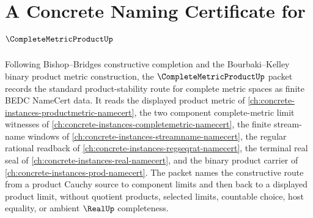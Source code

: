 \chapter{A Concrete Naming Certificate for $\CompleteMetricProductUp$}
\label{ch:concrete-instances-complete-metric-product-namecert}

Following Bishop--Bridges constructive completion and the Bourbaki--Kelley
binary product metric construction, the $\CompleteMetricProductUp$ packet
records the standard product-stability route for complete metric spaces as
finite BEDC NameCert data. It reads the displayed product metric of
\autoref{ch:concrete-instances-productmetric-namecert}, the two component
complete-metric limit witnesses of
\autoref{ch:concrete-instances-completemetric-namecert}, the finite
stream-name windows of \autoref{ch:concrete-instances-streamname-namecert},
the regular rational readback of
\autoref{ch:concrete-instances-regseqrat-namecert}, the terminal real seal of
\autoref{ch:concrete-instances-real-namecert}, and the binary product carrier
of \autoref{ch:concrete-instances-prod-namecert}. The packet names the
constructive route from a product Cauchy source to component limits and then
back to a displayed product limit, without quotient products, selected
limits, countable choice, host equality, or ambient $\RealUp$ completeness.

